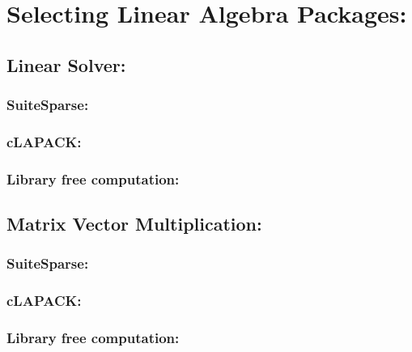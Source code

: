 \documentclass[]{article}
\begin{document}
\section{Selecting Linear Algebra Packages: }

\subsection{Linear Solver: }

\subsubsection{SuiteSparse: }

\subsubsection{cLAPACK: }

\subsubsection{Library free computation: }

\subsection{Matrix Vector Multiplication: }
\subsubsection{SuiteSparse: }

\subsubsection{cLAPACK: }

\subsubsection{Library free computation: }
\end{document}
